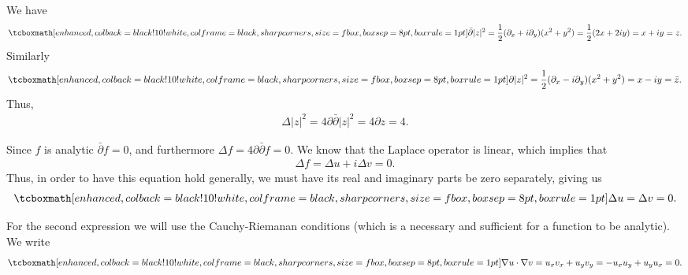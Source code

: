 
We have
\begin{eqnarray}
    \label{eq:partialbar-z2}
    \eqbox{
    \bar{\partial} |z|^2 = \frac{1}{2}(\partial_{x} + i \partial_{y}) (x^2 + y^2) = \frac{1}{2}(2x + 2iy) = x + iy = z
}
.\end{eqnarray}
Similarly
\begin{eqnarray}
    \label{eq:partial-z2}
    \eqbox{
    \partial |z|^2 = \frac{1}{2}(\partial_{x} - i \partial_{y}) (x^2 + y^2) = x - iy = \bar{z}
}
.\end{eqnarray}
Thus,
\begin{eqnarray}
    \label{eq:lap-z2}
    \Delta |z|^2 = 4 \partial\bar{\partial} |z|^2 = 4 \partial z = 4
.\end{eqnarray}





Since $f$ is analytic $\bar{\partial}f = 0$, and furthermore $\Delta f = 4\partial\bar{\partial}f = 0$.
We know that the Laplace operator is linear, which implies that
\begin{eqnarray}
    \label{eq:lap-f-uv}
    \Delta f = \Delta u + i \Delta v = 0 
.\end{eqnarray}
Thus, in order to have this equation hold generally, we must have its real and imaginary parts be zero separately, giving us
\begin{eqnarray}
    \label{eq:uv-harmonic}
    \eqbox{
    \Delta u = \Delta v = 0 
}
.\end{eqnarray}

For the second expression we will use the Cauchy-Riemanan conditions (which is a necessary and sufficient for a function to be analytic).
We write
\begin{eqnarray}
    \label{eq:gradu-gradv}
    \eqbox{
    \nabla u \cdot \nabla v = u_{x}v_{x} + u_{y}v_{y} = -u_{x}u_{y} + u_{y}u_{x} = 0
}
.\end{eqnarray}




